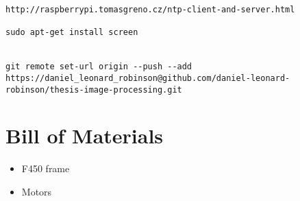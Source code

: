\begin{appendices}
\begin{lstlisting}
http://raspberrypi.tomasgreno.cz/ntp-client-and-server.html

sudo apt-get install screen


git remote set-url origin --push --add https://daniel_leonard_robinson@github.com/daniel-leonard-robinson/thesis-image-processing.git
\end{lstlisting}



\chapter{Bill of Materials}

\begin{itemize}
	\item F450 frame
	\item Motors
\end{itemize}

\end{appendices}
